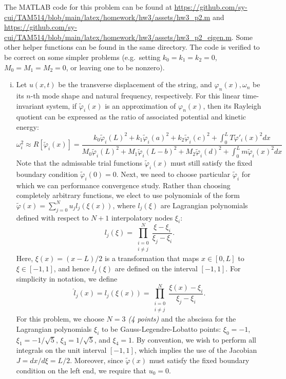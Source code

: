 The MATLAB code for this problem can be found at \url{https://github.com/sy-cui/TAM514/blob/main/latex/homework/hw3/assets/hw3_p2.m} and \url{https://github.com/sy-cui/TAM514/blob/main/latex/homework/hw3/assets/hw3_p2_eigen.m}. 
Some other helper functions can be found in the same directory. 
The code is verified to be correct on some simpler problems (e.g.~setting $k_0 = k_1 = k_2 = 0$, $M_0 = M_1 = M_2 = 0$, or leaving one to be nonzero).
\begin{enumerate}[(i)]
\item { %
    Let $u(x, t)$ be the transverse displacement of the string, and $\varphi_n(x), \omega_n$ be its $n$-th mode shape and natural frequency, respectively.
    For this linear time-invariant system, if $\tilde{\varphi}_i(x)$ is an approximation of $\varphi_n(x)$, then its Rayleigh quotient can be expressed as the ratio of associated potential and kinetic energy:
    \begin{equation}\label{eqn:hw3_p2_rq}
        \omega_i^2 \approx R[\tilde{\varphi}_i(x)] = \frac{
            k_0 {\tilde{\varphi}_i(L)}^2 + 
            k_1 {\tilde{\varphi}_i(a)}^2 + 
            k_2 {\tilde{\varphi}_i(c)}^2 + 
            \int_0^L T {\tilde{\varphi}'_i(x)}^2 dx 
        }{
            M_0 {\tilde{\varphi}_i(L)}^2 + 
            M_1 {\tilde{\varphi}_i(L-b)}^2 + 
            M_2 {\tilde{\varphi}_i(d)}^2 + 
            \int_0^L m {\tilde{\varphi}_i(x)}^2 dx
        }
    \end{equation}
    Note that the admissable trial functions $\tilde{\varphi}_i(x)$ must still satisfy the fixed boundary condition $\tilde{\varphi}_i(0) = 0$. 
    Next, we need to choose particular $\tilde{\varphi}_i$ for which we can performance convergence study.
    Rather than choosing completely arbitrary functions, we elect to use polynomials of the form $\tilde{\varphi}(x) = \sum_{j=0}^N u_j l_j(\xi(x))$, where $l_j(\xi)$ are Lagrangian polynomials defined with respect to $N+1$ interpolatory nodes $\xi_i$:
    \begin{equation}
        l_j(\xi) = \prod_{\substack{i=0 \\ i\neq j}}^N \frac{\xi - \xi_i}{\xi_j - \xi_i}.
    \end{equation}
    Here, $\xi(x) = (x - L)/2$ is a transformation that maps $x \in [0, L]$ to $\xi \in [-1, 1]$, and hence $l_j(\xi)$ are defined on the interval $[-1, 1]$.
    For simplicity in notation, we define 
    \begin{equation}
        \hat{l}_j(x) = l_j(\xi(x)) = \prod_{\substack{i=0 \\ i\neq j}}^N \frac{\xi(x) - \xi_i}{\xi_j - \xi_i}.
    \end{equation}
    For this problem, we choose \emph{$N = 3$ (4 points)} and the abscissa for the Lagrangian polynomials $\xi_i$ to be Gauss-Legendre-Lobatto points: $\xi_0 = -1$, $\xi_1 = -1/\sqrt{5}$, $\xi_3 = 1/\sqrt{5}$, and $\xi_4 = 1$.
    By convention, we wish to perform all integrals on the unit interval $[-1, 1]$, which implies the use of the Jacobian $J = dx / d\xi = L/2$. 
    Moreover, since $\tilde{\varphi}(x)$ must satisfy the fixed boundary condition on the left end, we require that $u_0 = 0$. 

}
\end{enumerate}
